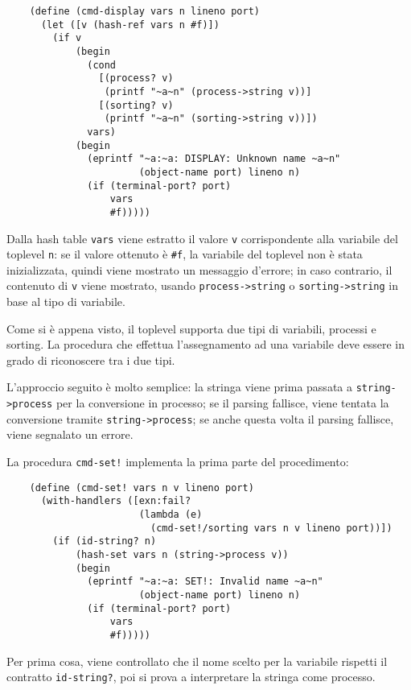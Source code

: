 \begin{lstlisting}
    (define (cmd-display vars n lineno port)
      (let ([v (hash-ref vars n #f)])
        (if v
            (begin
              (cond
                [(process? v)
                 (printf "~a~n" (process->string v))]
                [(sorting? v)
                 (printf "~a~n" (sorting->string v))])
              vars)
            (begin
              (eprintf "~a:~a: DISPLAY: Unknown name ~a~n"
                       (object-name port) lineno n)
              (if (terminal-port? port)
                  vars
                  #f)))))
\end{lstlisting}

Dalla hash table \lstinline{vars} viene estratto il valore \lstinline{v}
corrispondente alla variabile del toplevel \lstinline{n}: se il valore
ottenuto \`e \lstinline{#f}, la variabile del toplevel non \`e stata
inizializzata, quindi viene mostrato un messaggio d'errore; in caso
contrario, il contenuto di \lstinline{v} viene mostrato, usando
\lstinline{process->string} o \lstinline{sorting->string} in base al
tipo di variabile.

Come si \`e appena visto, il toplevel supporta due tipi di variabili,
processi e sorting. La procedura che effettua l'assegnamento ad una
variabile deve essere in grado di riconoscere tra i due tipi.

L'approccio seguito \`e molto semplice: la stringa viene prima passata a
\lstinline{string->process} per la conversione in processo; se il parsing
fallisce, viene tentata la conversione tramite
\lstinline{string->process}; se anche questa volta il parsing fallisce,
viene segnalato un errore.

La procedura \lstinline{cmd-set!} implementa la prima parte del
procedimento:

\begin{lstlisting}
    (define (cmd-set! vars n v lineno port)
      (with-handlers ([exn:fail?
                       (lambda (e)
                         (cmd-set!/sorting vars n v lineno port))])
        (if (id-string? n)
            (hash-set vars n (string->process v))
            (begin
              (eprintf "~a:~a: SET!: Invalid name ~a~n"
                       (object-name port) lineno n)
              (if (terminal-port? port)
                  vars
                  #f)))))
\end{lstlisting}

Per prima cosa, viene controllato che il nome scelto per la variabile
rispetti il contratto \lstinline{id-string?}, poi si prova a
interpretare la stringa come processo.

